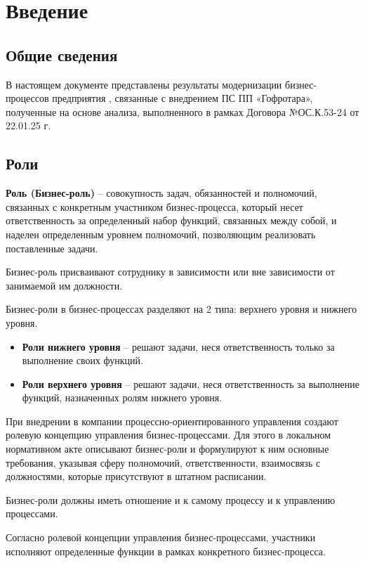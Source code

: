 \section{Введение}

\subsection{Общие сведения}

В настоящем документе представлены результаты модернизации бизнес-процессов предприятия \FIRMA, связанные с внедрением ПС ПП «Гофротара», полученные на основе анализа, выполненного в рамках Договора №ОС.К.53-24 от 22.01.25 г. 


\newpage
\subsection{Роли}

\textbf{Роль (Бизнес-роль)} – совокупность задач, обязанностей и полномочий, связанных с конкретным участником бизнес-процесса, который несет ответственность за определенный набор функций, связанных между собой, и наделен определенным уровнем полномочий, позволяющим реализовать поставленные задачи.

Бизнес-роль присваивают сотруднику в зависимости или вне зависимости от занимаемой им должности.  

Бизнес-роли в бизнес-процессах разделяют на 2 типа: верхнего уровня и нижнего уровня.

\begin{itemize}
\item{\textbf{Роли нижнего уровня} – решают задачи, неся ответственность только за  выполнение своих функций.}\
\item{\textbf{Роли верхнего уровня} – решают задачи, неся ответственность за выполнение функций, назначенных ролям нижнего уровня.} \
\end{itemize}

При внедрении в компании процессно-ориентированного управления создают ролевую концепцию управления бизнес-процессами. Для этого в локальном нормативном акте описывают бизнес-роли и формулируют к ним основные требования, указывая сферу полномочий, ответственности, взаимосвязь с должностями, которые присутствуют в штатном расписании. 

Бизнес-роли должны иметь отношение и к самому процессу и к управлению процессами. 

Согласно ролевой концепции управления бизнес-процессами, участники исполняют определенные функции в рамках конкретного бизнес-процесса.

